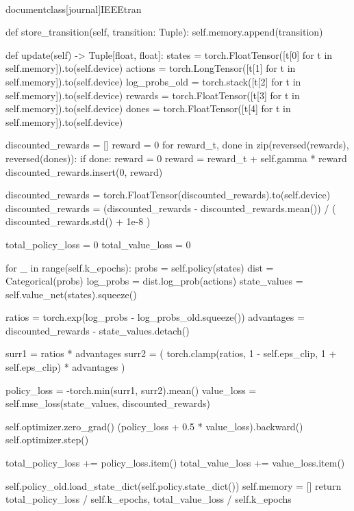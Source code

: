 \\documentclass[journal]{IEEEtran}
\begin{document}
    def store_transition(self, transition: Tuple):
        self.memory.append(transition)

    def update(self) -> Tuple[float, float]:
        states = torch.FloatTensor([t[0] for t in self.memory]).to(self.device)
        actions = torch.LongTensor([t[1] for t in self.memory]).to(self.device)
        log_probs_old = torch.stack([t[2] for t in self.memory]).to(self.device)
        rewards = torch.FloatTensor([t[3] for t in self.memory]).to(self.device)
        dones = torch.FloatTensor([t[4] for t in self.memory]).to(self.device)

        discounted_rewards = []
        reward = 0
        for reward_t, done in zip(reversed(rewards), reversed(dones)):
            if done:
                reward = 0
            reward = reward_t + self.gamma * reward
            discounted_rewards.insert(0, reward)

        discounted_rewards = torch.FloatTensor(discounted_rewards).to(self.device)
        discounted_rewards = (discounted_rewards - discounted_rewards.mean()) / (
            discounted_rewards.std() + 1e-8
        )

        total_policy_loss = 0
        total_value_loss = 0

        for _ in range(self.k_epochs):
            probs = self.policy(states)
            dist = Categorical(probs)
            log_probs = dist.log_prob(actions)
            state_values = self.value_net(states).squeeze()

            ratios = torch.exp(log_probs - log_probs_old.squeeze())
            advantages = discounted_rewards - state_values.detach()

            surr1 = ratios * advantages
            surr2 = (
                torch.clamp(ratios, 1 - self.eps_clip, 1 + self.eps_clip) * advantages
            )

            policy_loss = -torch.min(surr1, surr2).mean()
            value_loss = self.mse_loss(state_values, discounted_rewards)

            self.optimizer.zero_grad()
            (policy_loss + 0.5 * value_loss).backward()
            self.optimizer.step()

            total_policy_loss += policy_loss.item()
            total_value_loss += value_loss.item()

        self.policy_old.load_state_dict(self.policy.state_dict())
        self.memory = []
        return total_policy_loss / self.k_epochs, total_value_loss / self.k_epochs
\end{document}
